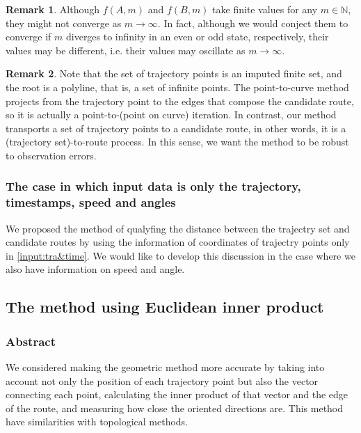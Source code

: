 \documentclass{article}
\numberwithin{equation}{section}
\theoremstyle{definition}
\newtheorem{remark}[remark]{Remark}
\newcommand{\N}{\mathbb{N}}
\begin{document}
\begin{remark}
Although $f(A,m)$ and $f(B,m)$ take finite values for any $m\in\N$, they might not converge as $m\to\infty$.
In fact, although we would conject them to converge if $m$ diverges to infinity in an even or odd state, respectively, their values may be different, i.e. their values may oscillate as $m\to\infty$.
\end{remark}

\begin{remark}
Note that the set of trajectory points is an imputed finite set, and the root is a polyline, that is, a set of infinite points.
The point-to-curve method projects from the trajectory point to the edges that compose the candidate route, so it is actually a point-to-(point on curve) iteration.
In contrast, our method transports a set of trajectory points to a candidate route, in other words, it is a (trajectory set)-to-route process.
In this sense, we want the method to be robust to observation errors.
\end{remark}

\subsubsection{The case in which input data is only the trajectory, timestamps, speed and angles} %

We proposed the method of qualyfing the distance between the trajectry set and candidate routes by using the information of coordinates of trajectry points only in \autoref{input:tra&time}.
We would like to develop this discussion in the case where we also have information on speed and angle.





\subsection{The method using Euclidean inner product}

\subsubsection{Abstract}
We considered making the geometric method more accurate by taking into account not only the position of each trajectory point but also the vector connecting each point, calculating the inner product of that vector and the edge of the route, and measuring how close the oriented directions are. This method have similarities with topological methods.
\end{document}
